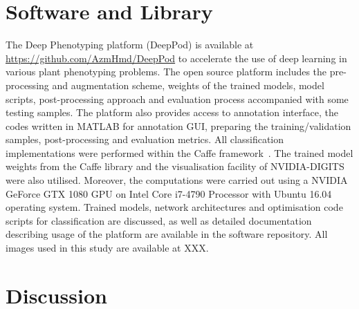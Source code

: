 \documentclass[a4paper,num-refs]{oup-contemporary}
\begin{document}
\section{Software and Library}
The Deep Phenotyping  platform (DeepPod) is available at \url{https://github.com/AzmHmd/DeepPod} to accelerate the use of deep learning in  various plant phenotyping problems. The open source platform includes the pre-processing and augmentation scheme, weights of the trained models, model scripts, post-processing approach and evaluation process accompanied with some testing samples. The platform also provides access to annotation interface, the codes written in MATLAB for annotation GUI, preparing the training/validation samples, post-processing  and evaluation metrics. All classification implementations were performed within the Caffe framework~\cite{jia2014caffe}. The trained model weights from the Caffe library and the visualisation facility of NVIDIA-DIGITS were also utilised. Moreover, the computations were carried out using a NVIDIA GeForce GTX 1080 GPU on Intel Core i7-4790 Processor with Ubuntu 16.04 operating system. Trained models,  network architectures and optimisation code scripts for classification are discussed, as well as detailed documentation describing usage of the platform are available in the software repository. All images used in this study are available at {\color{red}XXX}.

\section{Discussion}
\end{document}

